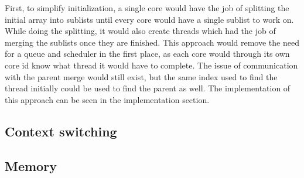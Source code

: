 First, to simplify initialization, a single core would have the job of splitting
the initial array into sublists until every core would have a single sublist to
work on. While doing the splitting, it would also create threads which had the
job of merging the sublists once they are finished. This approach would remove
the need for a queue and scheduler in the first place, as each core would
through its own core id know what thread it would have to complete. The issue of
communication with the parent merge would still exist, but the same index used
to find the thread initially could be used to find the parent as well. The
implementation of this approach can be seen in the implementation section.


\subsection{Context switching}



\subsection{Memory}
